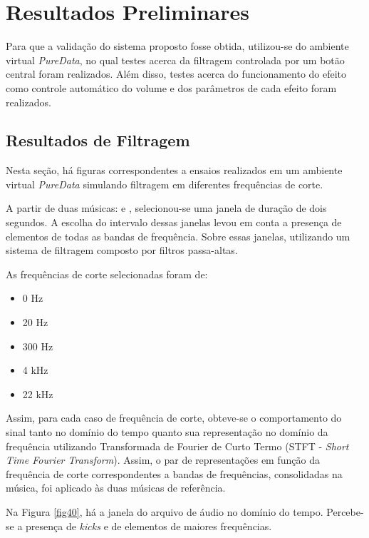 \chapter[Resultados Preliminares]{Resultados Preliminares}
\label{sec:Resultados}

Para que a validação do sistema proposto fosse obtida, utilizou-se do ambiente virtual \textit{PureData}, no qual testes acerca da filtragem controlada por um botão central foram realizados. Além disso, testes acerca do funcionamento do efeito como controle automático do volume e dos parâmetros de cada efeito foram realizados. 

\section{Resultados de Filtragem}

Nesta seção, há figuras correspondentes a ensaios realizados em um ambiente virtual \textit{PureData} simulando filtragem em diferentes frequências de corte.

A partir de duas músicas: \cite{track01} e \cite{track02}, selecionou-se uma janela de duração de dois segundos. A escolha do intervalo dessas janelas levou em conta a presença de elementos de todas as bandas de frequência. Sobre essas janelas, utilizando um sistema de filtragem composto por filtros passa-altas. 

As frequências de corte selecionadas foram de:

\begin{itemize}
    \item 0 Hz
    \item 20 Hz
    \item 300 Hz
    \item 4 kHz
    \item 22 kHz
\end{itemize}

Assim, para cada caso de frequência de corte, obteve-se o comportamento do sinal tanto no domínio do tempo quanto sua representação no domínio da frequência utilizando Transformada de Fourier de Curto Termo (STFT - \textit{Short Time Fourier Transform}). Assim, o par de representações em função da frequência de corte correspondentes a bandas de frequências, consolidadas na música, foi aplicado às duas músicas de referência. 

Na Figura \ref{fig40}, há a janela do arquivo de áudio no domínio do tempo. Percebe-se a presença de \textit{kicks} e de elementos de maiores frequências.

